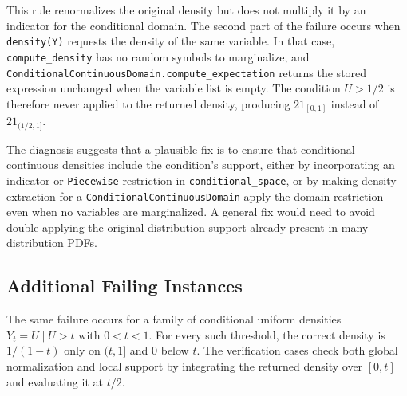 \documentclass[11pt]{article}
\begin{document}
This rule renormalizes the original density but does not multiply it by an
indicator for the conditional domain.  The second part of the failure occurs
when \texttt{density(Y)} requests the density of the same variable.  In that
case, \texttt{compute\_density} has no random symbols to marginalize, and
\texttt{ConditionalContinuousDomain.compute\_expectation} returns the stored
expression unchanged when the variable list is empty.  The condition
\(U>1/2\) is therefore never applied to the returned density, producing
\(2\mathrm{1}_{[0,1]}\) instead of \(2\mathrm{1}_{(1/2,1]}\).

The diagnosis suggests that a plausible fix is to ensure that conditional
continuous densities include the condition's support, either by incorporating an
indicator or \texttt{Piecewise} restriction in
\texttt{conditional\_space}, or by making density extraction for a
\texttt{ConditionalContinuousDomain} apply the domain restriction even when no
variables are marginalized.  A general fix would need to avoid double-applying
the original distribution support already present in many distribution PDFs.

\subsection{Additional Failing Instances}

The same failure occurs for a family of conditional uniform densities
\(Y_t = U \mid U>t\) with \(0<t<1\).  For every such threshold, the correct
density is \(1/(1-t)\) only on \((t,1]\) and \(0\) below \(t\).  The verification
cases check both global normalization and local support by integrating the
returned density over \([0,t]\) and evaluating it at \(t/2\).
\end{document}
